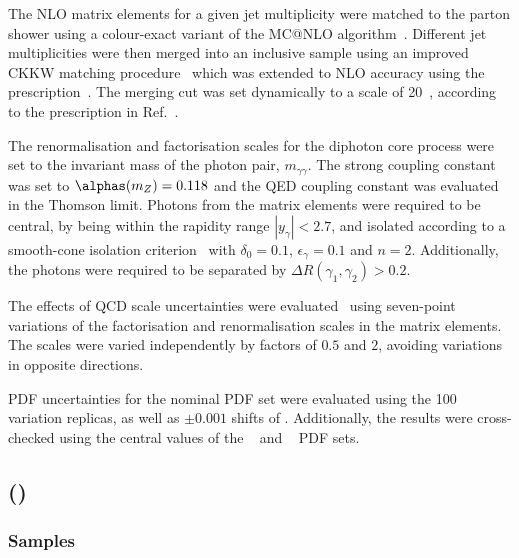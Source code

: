 The NLO matrix elements for a given jet multiplicity were matched to the parton
shower using a colour-exact variant of the MC@NLO algorithm~\cite{Hoeche:2011fd}. 
Different jet multiplicities were then merged
into an inclusive sample using an improved CKKW matching
procedure~\cite{Catani:2001cc,Hoeche:2009rj} which was extended to NLO
accuracy using the \MEPSatNLO prescription~\cite{Hoeche:2012yf}.
The merging cut was set dynamically to a scale of 20~\GeV{},
according to the prescription in Ref.~\cite{Siegert:2016bre}.

The renormalisation and factorisation scales for the diphoton core process
were set to the invariant mass of the photon pair, $m_{\gamma\gamma}$.
The strong coupling constant was set to $\alphas (m_Z)= 0.118$ and the QED coupling
constant was evaluated in the Thomson limit. Photons from the matrix elements were required to be central, 
by being within the rapidity range $|y_{\gamma}|<2.7$, and isolated according to a smooth-cone isolation 
criterion~\cite{Frixione:1998jh} with $\delta_0=0.1$, $\epsilon_{\gamma}=0.1$ and $n=2$. 
Additionally, the photons were required to be separated by $\Delta R(\gamma_1,\gamma_2) > 0.2$.


The effects of QCD scale uncertainties were evaluated~\cite{Bothmann:2016nao} using
seven-point variations of the factorisation and renormalisation scales in the matrix elements.
The scales were varied independently by factors of $0.5$ and $2$, avoiding variations in opposite directions.

PDF uncertainties for the nominal PDF set were
evaluated using the 100 variation replicas, as well as $\pm 0.001$ shifts
of \alphas. Additionally, the results were cross-checked using the central values of the 
\CT[14nnlo]~\cite{Dulat:2015mca} and \MMHT[nnlo]~\cite{Harland-Lang:2014zoa} 
PDF sets.


\subsection[Sherpa (MEPS@NLO)]{\SHERPA (\MEPSatNLO)}

\subsubsection*{Samples}

